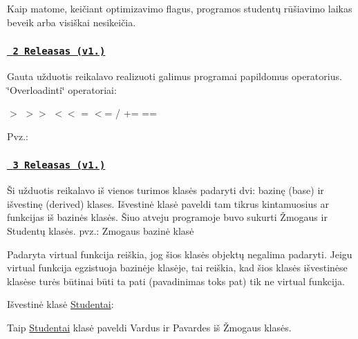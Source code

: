 Kaip matome, keičiant optimizavimo flag\textquotesingle{}us, programos studentų rūšiavimo laikas beveik arba visiškai nesikeičia.

\subsubsection*{\href{https://github.com/Dr1dd/3uzd/releases/tag/v1.2}{\texttt{ 2 Releasas (v1.)}}}

Gauta užduotis reikalavo realizuoti galimus programai papildomus operatorius. \char`\"{}\+Overload\textquotesingle{}inti\char`\"{} operatoriai\+:

{\ttfamily $>$} {\ttfamily $>$$>$} {\ttfamily $<$$<$} {\ttfamily =} {\ttfamily $<$=} {\ttfamily /} {\ttfamily +=} {\ttfamily ==}

Pvz.\+:



\subsubsection*{\href{https://github.com/Dr1dd/3uzd/releases/tag/v1.5}{\texttt{ 3 Releasas (v1.)}}}

Ši užduotis reikalavo iš vienos turimos klasės padaryti dvi\+: bazinę (base) ir išvestinę (derived) klases. Išvestinė klasė paveldi tam tikrus kintamuosius ar funkcijas iš bazinės klasės. Šiuo atveju programoje buvo sukurti {\ttfamily Žmogaus} ir {\ttfamily Studentų} klasės. pvz.\+: Zmogaus bazinė klasė 
\begin{DoxyCode}{0}
\DoxyCodeLine{\}}
\DoxyCodeLine{\}}
\DoxyCodeLine{\};}
\end{DoxyCode}
 Padaryta {\ttfamily virtual} funkcija reiškia, jog šios klasės objektų negalima padaryti. Jeigu virtual funkcija egzistuoja bazinėje klasėje, tai reiškia, kad šios klasės išvestinėse klasėse turės būtinai būti ta pati (pavadinimas toks pat) tik ne virtual funkcija.

Išvestinė klasė {\ttfamily \mbox{\hyperlink{class_studentai}{Studentai}}}\+:


\begin{DoxyCode}{0}
\DoxyCodeLine{}
\DoxyCodeLine{\}}
\end{DoxyCode}
 Taip \mbox{\hyperlink{class_studentai}{Studentai}} klasė paveldi {\ttfamily Vardus} ir {\ttfamily Pavardes} iš {\ttfamily Žmogaus} klasės. 